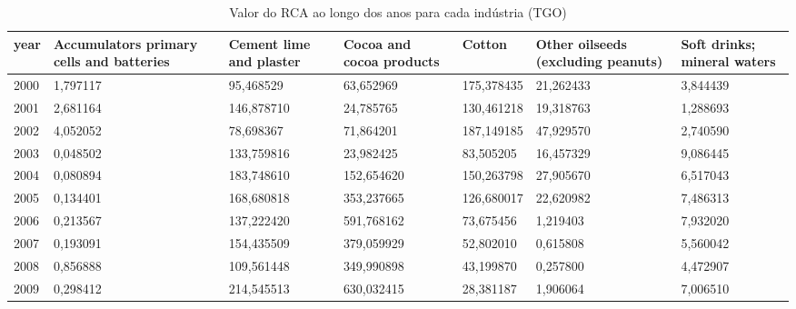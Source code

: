 \begin{table}
\centering
\caption{Valor do RCA ao longo dos anos para cada indústria (TGO)}
\begin{tabular}{p{1cm}p{2cm}p{2cm}p{2cm}p{2cm}p{2cm}p{2cm}}
\toprule
 year &  Accumulators primary cells and batteries &  Cement lime and plaster &  Cocoa and cocoa products &     Cotton &  Other oilseeds (excluding peanuts) &  Soft drinks; mineral waters \\
\midrule
 2000 &                                  1,797117 &                95,468529 &                 63,652969 & 175,378435 &                           21,262433 &                     3,844439 \\
 2001 &                                  2,681164 &               146,878710 &                 24,785765 & 130,461218 &                           19,318763 &                     1,288693 \\
 2002 &                                  4,052052 &                78,698367 &                 71,864201 & 187,149185 &                           47,929570 &                     2,740590 \\
 2003 &                                  0,048502 &               133,759816 &                 23,982425 &  83,505205 &                           16,457329 &                     9,086445 \\
 2004 &                                  0,080894 &               183,748610 &                152,654620 & 150,263798 &                           27,905670 &                     6,517043 \\
 2005 &                                  0,134401 &               168,680818 &                353,237665 & 126,680017 &                           22,620982 &                     7,486313 \\
 2006 &                                  0,213567 &               137,222420 &                591,768162 &  73,675456 &                            1,219403 &                     7,932020 \\
 2007 &                                  0,193091 &               154,435509 &                379,059929 &  52,802010 &                            0,615808 &                     5,560042 \\
 2008 &                                  0,856888 &               109,561448 &                349,990898 &  43,199870 &                            0,257800 &                     4,472907 \\
 2009 &                                  0,298412 &               214,545513 &                630,032415 &  28,381187 &                            1,906064 &                     7,006510 \\

\end{tabular}
\end{table}
